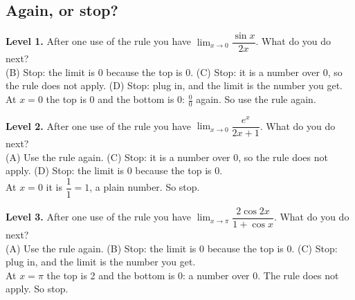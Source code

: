 \documentclass[11pt]{article}
\begin{document}
\subsection*{Again, or stop?}
\noindent\textbf{Level 1.} After one use of the rule you have $\displaystyle\lim_{x\to0}\dfrac{\sin x}{2x}$. What do you do next?\\  \quad (B) Stop: the limit is 0 because the top is 0. \quad (C) Stop: it is a number over 0, so the rule does not apply. \quad (D) Stop: plug in, and the limit is the number you get.\\  \quad At $x=0$ the top is 0 and the bottom is 0: $\frac00$ again. So use the rule again.\par\medskip
\noindent\textbf{Level 2.} After one use of the rule you have $\displaystyle\lim_{x\to0}\dfrac{e^x}{2x+1}$. What do you do next?\\ (A) Use the rule again. \quad {} \quad (C) Stop: it is a number over 0, so the rule does not apply. \quad (D) Stop: the limit is 0 because the top is 0.\\  \quad At $x=0$ it is $\dfrac11=1$, a plain number. So stop.\par\medskip
\noindent\textbf{Level 3.} After one use of the rule you have $\displaystyle\lim_{x\to\pi}\dfrac{2\cos 2x}{1+\cos x}$. What do you do next?\\ (A) Use the rule again. \quad (B) Stop: the limit is 0 because the top is 0. \quad (C) Stop: plug in, and the limit is the number you get. \quad {}\\  \quad At $x=\pi$ the top is 2 and the bottom is 0: a number over 0. The rule does not apply. So stop.\par\medskip
\end{document}

